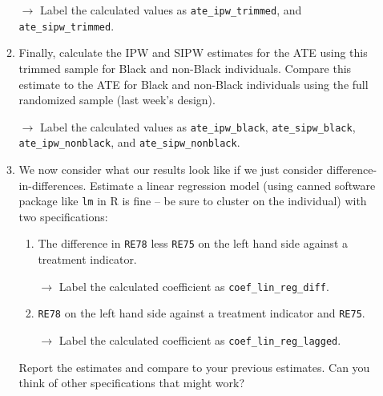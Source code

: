 \documentclass[11pt, a4paper]{article}
\begin{document}
\begin{enumerate}
\begin{enumerate}
    \hspace{10pt} $\rightarrow$ Label the calculated values as \texttt{ate\_ipw\_trimmed}, and \texttt{ate\_sipw\_trimmed}.
  \item Finally, calculate the IPW and SIPW estimates for the ATE
    using this trimmed sample for Black and non-Black
    individuals. Compare this estimate to the ATE for Black and
    non-Black individuals using the full randomized sample (last week's design).

    \hspace{10pt} $\rightarrow$ Label the calculated values as \texttt{ate\_ipw\_black},  \texttt{ate\_sipw\_black},  \texttt{ate\_ipw\_nonblack}, and  \texttt{ate\_sipw\_nonblack}.

    \item We now consider what our results look like if we just consider difference-in-differences. Estimate a linear regression model (using canned software package like \texttt{lm} in R is fine -- be sure to cluster on the individual) with two specifications:
    \begin{enumerate}
      \item The difference in \texttt{RE78} less \texttt{RE75} on the left hand side against a treatment indicator. 
     
      \hspace{10pt} $\rightarrow$ Label the calculated coefficient as \texttt{coef\_lin\_reg\_diff}.
      \item \texttt{RE78} on the left hand side against a treatment indicator and \texttt{RE75}.
      
      \hspace{10pt} $\rightarrow$ Label the calculated coefficient as \texttt{coef\_lin\_reg\_lagged}.
    \end{enumerate}
  Report the estimates and compare to your previous estimates. Can you think of other specifications that might work? 
\end{enumerate}
\end{enumerate}
\end{document}
